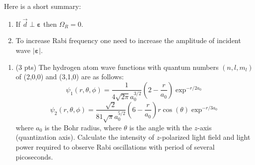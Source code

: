 Here is a short summary:
\begin{enumerate}
	\item If $\vec{d} \perp \bm{\varepsilon}$ then $\Omega_R = 0$.
	\item To increase Rabi frequency one need to increase the amplitude of incident wave $\left| \bm{\varepsilon} \right|$.
\end{enumerate}


\begin{hw}
	\begin{enumerate}
		\item (3 pts) The hydrogen atom wave functions with quantum numbers $(n, l, m_{l})$ of (2,0,0) and (3,1,0) are as follows:
		$$
		\psi_{1}(r,\theta,\phi)=\dfrac{1}{4\sqrt{2\pi}a_{0}^{3/2}}\left(2-\dfrac{r}{a_{0}}\right)\exp^{-r/2a_{0}}
		$$
		$$
		\psi_{2}(r,\theta,\phi)=\dfrac{\sqrt{2}}{81\sqrt{\pi}a_{0}^{5/2}}\left(6-\dfrac{r}{a_{0}}\right)r\cos(\theta)\exp^{-r/3a_{0}}
		$$
		where $a_{0}$ is the Bohr radius, where $\theta$ is the angle with the $z$-axis (quantization axis). Calculate the intensity of $z$-polarized light field and light power required to observe Rabi oscillations with period of several picoseconds.
	\end{enumerate}
\end{hw}
